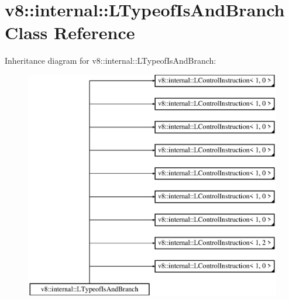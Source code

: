 \hypertarget{classv8_1_1internal_1_1_l_typeof_is_and_branch}{}\section{v8\+:\+:internal\+:\+:L\+Typeof\+Is\+And\+Branch Class Reference}
\label{classv8_1_1internal_1_1_l_typeof_is_and_branch}
Inheritance diagram for v8\+:\+:internal\+:\+:L\+Typeof\+Is\+And\+Branch\+:\begin{figure}[H]
\begin{center}
\leavevmode
\includegraphics[height=10.000000cm]{classv8_1_1internal_1_1_l_typeof_is_and_branch}
\end{center}
\end{figure}
